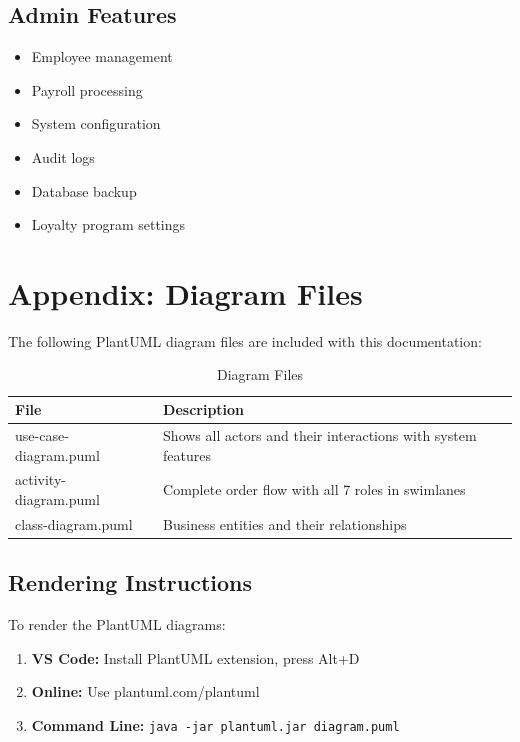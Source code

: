 \documentclass[12pt,a4paper]{article}
\begin{document}
\subsection{Admin Features}
\begin{itemize}
    \item Employee management
    \item Payroll processing
    \item System configuration
    \item Audit logs
    \item Database backup
    \item Loyalty program settings
\end{itemize}

\section{Appendix: Diagram Files}

The following PlantUML diagram files are included with this documentation:

\begin{table}[h]
\centering
\begin{tabular}{@{}lp{8cm}@{}}
\toprule
\textbf{File} & \textbf{Description} \\
\midrule
use-case-diagram.puml & Shows all actors and their interactions with system features \\
activity-diagram.puml & Complete order flow with all 7 roles in swimlanes \\
class-diagram.puml & Business entities and their relationships \\
\bottomrule
\end{tabular}
\caption{Diagram Files}
\end{table}

\subsection{Rendering Instructions}

To render the PlantUML diagrams:

\begin{enumerate}
    \item \textbf{VS Code:} Install PlantUML extension, press Alt+D
    \item \textbf{Online:} Use plantuml.com/plantuml
    \item \textbf{Command Line:} \texttt{java -jar plantuml.jar diagram.puml}
\end{enumerate}
\end{document}
